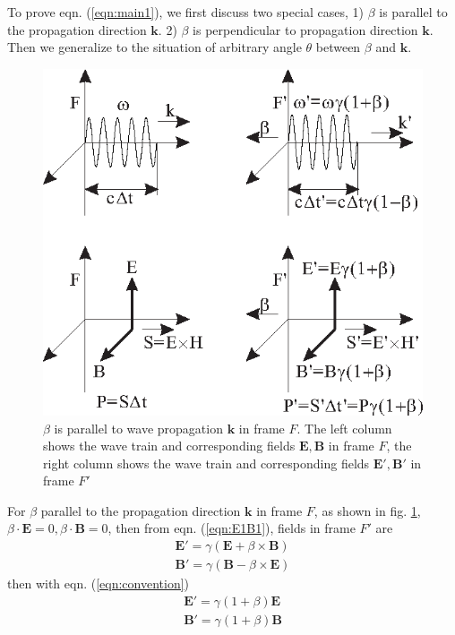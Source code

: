 \documentclass[prd,showpacs,twocolumn]{revtex4-1}
\begin{document}
To prove eqn. (\ref{eqn:main1}), we first discuss two special cases, 1) $\beta$ is parallel to the propagation direction $\mathbf{k}$. 2) $\beta$ is perpendicular to propagation direction $\mathbf{k}$. Then we generalize to the situation of arbitrary angle $\theta$ between $\beta$ and $\mathbf{k}$.

\begin{figure}
\center
\includegraphics{Graph1.eps}
\caption{$\beta$ is parallel to wave propagation $\mathbf{k}$ in frame $F$. The left column shows the wave train and corresponding fields $\mathbf{E}, \mathbf{B}$ in frame $F$, the right column shows the wave train and corresponding fields $\mathbf{E}', \mathbf{B}'$ in frame $F'$}
\label{fig:P}
\end{figure}

For $\beta$ parallel to the propagation direction $\mathbf{k}$ in frame $F$, as shown in fig. \ref{fig:P}, $\beta\cdot\mathbf{E}=0, \beta\cdot\mathbf{B}=0$, then from eqn. (\ref{eqn:E1B1}), fields in frame $F'$ are
\begin{eqnarray}
\mathbf{E'}=\gamma(\mathbf{E}+\beta\times \mathbf{B})\nonumber\\
\mathbf{B'}=\gamma(\mathbf{B}-\beta\times \mathbf{E})
\end{eqnarray}
then with eqn. (\ref{eqn:convention})
\begin{eqnarray}
\mathbf{E'}=\gamma(1+\beta)\mathbf{E}\nonumber\\
\mathbf{B'}=\gamma(1+\beta)\mathbf{B}
\label{eqn:fP}
\end{eqnarray}
\end{document}
